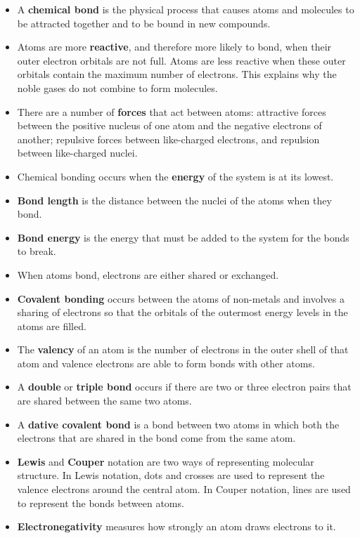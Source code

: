 \begin{itemize}
\item{A \textbf{chemical bond} is the physical process that causes atoms and molecules to be attracted together and to be bound in new compounds.}
\item{Atoms are more \textbf{reactive}, and therefore more likely to bond, when their outer electron orbitals are not full. Atoms are less reactive when these outer orbitals contain the maximum number of electrons. This explains why the noble gases do not combine to form molecules.}
\item{There are a number of \textbf{forces} that act between atoms: attractive forces between the positive nucleus of one atom and the negative electrons of another; repulsive forces between like-charged electrons, and repulsion between like-charged nuclei.}
\item{Chemical bonding occurs when the \textbf{energy} of the system is at its lowest.}
\item{\textbf{Bond length} is the distance between the nuclei of the atoms when they bond.}
\item{\textbf{Bond energy} is the energy that must be added to the system for the bonds to break.}
\item{When atoms bond, electrons are either shared or exchanged.}
\item{\textbf{Covalent bonding} occurs between the atoms of non-metals and involves a sharing of electrons so that the orbitals of the outermost energy levels in the atoms are filled.}
\item{The \textbf{valency} of an atom is the number of electrons in the outer shell of that atom and valence electrons are able to form bonds with other atoms.}
\item{A \textbf{double} or \textbf{triple bond} occurs if there are two or three electron pairs that are shared between the same two atoms.}
\item{A \textbf{dative covalent bond} is a bond between two atoms in which both the electrons that are shared in the bond come from the same atom.}
\item{\textbf{Lewis} and \textbf{Couper} notation are two ways of representing molecular structure. In Lewis notation, dots and crosses are used to represent the valence electrons around the central atom. In Couper notation, lines are used to represent the bonds between atoms.}
\item{\textbf{Electronegativity} measures how strongly an atom draws electrons to it.}

\end{itemize}
